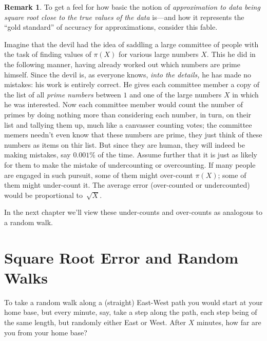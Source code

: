 \documentclass[openany]{book}
\theoremstyle{plain}
\theoremstyle{definition}
\newtheorem{remark}[theorem]{Remark}
\begin{document}
\begin{remark}
  To get a feel for how basic the notion of {\em approximation to data
    being square root close to the true values of the data} is---and
  how it represents the ``gold standard'' of accuracy for
  approximations, consider this fable.

  Imagine that the devil had the idea of saddling a large committee of
  people with the task of finding values of $\pi(X)$ for various large
  numbers $X$.  This he did in the following manner, having already
  worked out which numbers are prime himself. Since the devil is, as
  everyone knows, {\em into the details,} he has made no mistakes: his
  work is entirely correct.  He gives each committee member a copy of
  the list of all {\em prime numbers} between $1$ and one of the large
  numbers $X$ in which he was interested.  Now each committee member
  would count the number of primes by doing nothing more than
  considering each number, in turn, on their list and tallying them
  up, much like a canvasser counting votes; the committee memers  needn't even know that these numbers are prime, they just think of these numbers as items on thir list. But since they are human,
  they will indeed be making mistakes, say $0.001\%$ of the time.
  Assume further that it is just as likely for them to make the
  mistake of undercounting or overcounting.  If many people are
  engaged in such pursuit, some of them might over-count $\pi(X)$;
  some of them might under-count it. The average error (over-counted
  or undercounted) would be proportional to~${\sqrt X}$.

  In the next chapter we'll view these under-counts and over-counts as analogous to a random walk.


\end{remark}


\chapter{Square Root Error and Random Walks}

 To take a random walk along a (straight) East-West path  you would start at your home base, but every minute, say, take a step along the path, each step being of the same length, but randomly either East or West. After $X$ minutes, how far are you from your home base?
\end{document}
